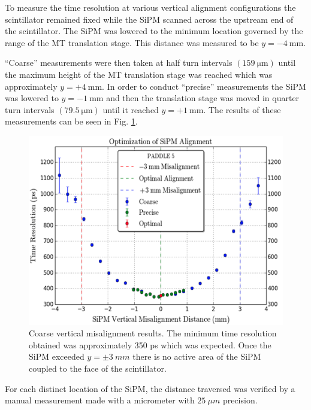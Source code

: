 To measure the time resolution at various vertical alignment configurations the scintillator remained fixed while the SiPM scanned across the upstream end of the scintillator. The SiPM was lowered to the minimum location governed by the range of the MT translation stage.  This distance was measured to be $y = \mathrm{-4~mm}$.  

``Coarse'' measurements were then taken at half turn intervals $(159\ \mathrm{\mu m})$ until the maximum height of the MT translation stage was reached which was approximately $y = +4\ \mathrm{mm}$.  In order to conduct ``precise'' measurements the SiPM was lowered to $y = \mathrm{-1~mm}$ and then the translation stage was moved in quarter turn intervals $(79.5\ \mathrm{\mu m})$ until it reached $y = \mathrm{+1~mm}$.  The results of these measurements can be seen in Fig. \ref{fig:sipm_va_coarse}.
\begin{figure}[!htb]
	\centering
	\includegraphics[width=1.0\columnwidth]{misalignment/figs/sipm_va_coarse_v2}
	\caption{Coarse vertical misalignment results.  The minimum time resolution obtained was approximately 350 ps which was expected.  Once the SiPM exceeded $y = \pm 3\ mm$ there is no active area of the SiPM coupled to the face of the scintillator.}
	\label{fig:sipm_va_coarse}
\end{figure}
For each distinct location of the SiPM, the distance traversed was verified by a manual measurement made with a micrometer with $25\ \mu m$ precision.

